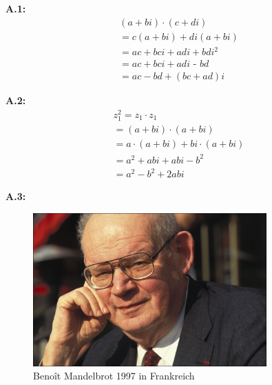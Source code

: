 
\noindent\textbf{A.1:}\label{app:1}
\begin{equation}\tag{A.1}\label{eq:complex-numbers-multiplication}
  \begin{split}
    (a + bi) \cdot (c + di) \\
    =  c(a + bi) + di(a + bi) \\
    = ac +bci + adi + bdi^2 \\
    = ac + bci + adi \textbf{ - } bd \\
    = ac - bd +(bc + ad)i
  \end{split}
\end{equation}

\noindent\textbf{A.2:}\label{app:2}
\begin{equation}\tag{A.2}\label{eq:complex-numbes-squaring}
  \begin{split}
    z_1^2
    = z_1 \cdot z_1 \\
    = (a + bi) \cdot (a + bi) \\
    = a \cdot (a + bi) + bi \cdot (a + bi) \\
    = a^2 + abi + abi - b^2 \\
    = a^2 - b^2 + 2abi
  \end{split}
\end{equation}

\noindent\textbf{A.3:}\label{app:3}
\begin{figure}[H]\label{fig:benoit-mandelbrot-picture}
\begin{center}
  \includegraphics[width=0.8\textwidth]{images/benoit-mandelbrot}
  \caption{Benoît Mandelbrot 1997 in Frankreich~\cite{gaillarde_benoit_1997}}
\end{center}
\end{figure}

